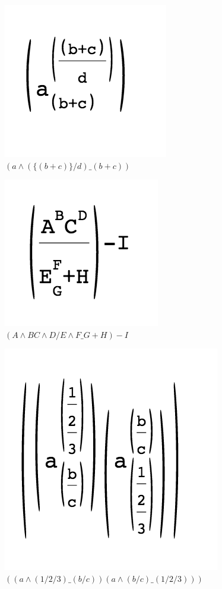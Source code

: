 \begin{figure}[H]
      \begin{centering}
        \includegraphics{imgs/b}
        \caption{$(a\wedge(\{(b+c)\}/d)\_(b+c))$}
       \end{centering}
\end{figure}
\begin{figure}[H]
      \begin{centering}
        \includegraphics{imgs/c}
        \caption{$(A\wedge BC\wedge D/E\wedge F\_G+H)-I$}
       \end{centering}
\end{figure}
\begin{figure}[H]
      \begin{centering}
        \includegraphics{imgs/d}
        \caption{$((a\wedge(1/2/3)\_(b/c))(a\wedge(b/c)\_(1/2/3)))$}
       \end{centering}
\end{figure}

